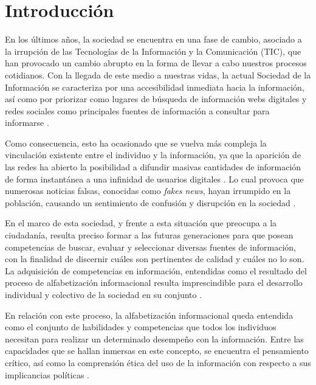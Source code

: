 \documentclass{textolivre}
\begin{document}
\begin{polyabstract}
\begin{english}
\begin{abstract}
\end{abstract}
\end{english}

\end{polyabstract}


\section{Introducción}\label{intro}
En los últimos años, la sociedad se encuentra en una fase de cambio, asociado a la irrupción de las Tecnologías de la Información y la Comunicación (TIC), que han provocado un cambio abrupto en la forma de llevar a cabo nuestros procesos cotidianos. Con la llegada de este medio a nuestras vidas, la actual Sociedad de la Información se caracteriza por una accesibilidad inmediata hacia la información, así como por priorizar como lugares de búsqueda de información webs digitales y redes sociales como principales fuentes de información a consultar para informarse \cite{alfonso2019}. %

Como consecuencia, esto ha ocasionado que se vuelva más compleja la vinculación existente entre el individuo y la información, ya que la aparición de las redes ha abierto la posibilidad a difundir masivas cantidades de información de forma instantánea a una infinidad de usuarios digitales \cite{alonsoelat2020}. %
Lo cual provoca que numerosas noticias falsas, conocidas como \emph{fakes news}, hayan irrumpido en la población, causando un sentimiento de confusión y disrupción en la sociedad \cite{lopez-borrull2018}. %

En el marco de esta sociedad, y frente a esta situación que preocupa a la ciudadanía, resulta preciso formar a las futuras generaciones para que posean competencias de buscar, evaluar y seleccionar diversas fuentes de información, con la finalidad de discernir cuáles son pertinentes de calidad y cuáles no lo son. La adquisición de competencias en información, entendidas como el resultado del proceso de alfabetización informacional resulta imprescindible para el desarrollo individual y colectivo de la sociedad en su conjunto \cite{alonso-varela2020}. %

En relación con este proceso, la alfabetización informacional queda entendida como el conjunto de habilidades y competencias que todos los individuos necesitan para realizar un determinado desempeño con la información. Entre las capacidades que se hallan inmersas en este concepto, se encuentra el pensamiento crítico, así como la comprensión ética del uso de la información con respecto a sus implicancias políticas \cite{torrell2020}. %
\end{document}
